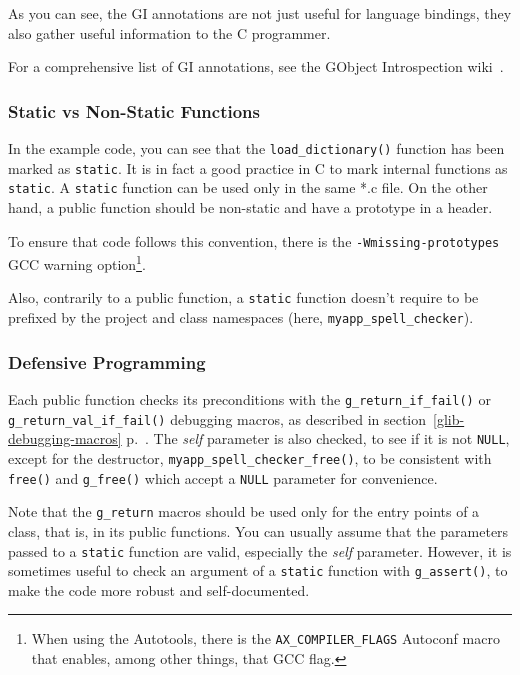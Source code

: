 As you can see, the GI annotations are not just useful for language bindings, they also gather useful information to the C programmer.

For a comprehensive list of GI annotations, see the GObject Introspection wiki~\cite{gobject-introspection}.

\subsubsection{Static vs Non-Static Functions}
In the example code, you can see that the \lstinline{load_dictionary()} function has been marked as \lstinline{static}. It is in fact a good practice in C to mark internal functions as \lstinline{static}. A \lstinline{static} function can be used only in the same *.c file. On the other hand, a public function should be non-static and have a prototype in a header.

To ensure that code follows this convention, there is the \texttt{-Wmissing-prototypes} GCC warning option\footnote{When using the Autotools, there is the \texttt{AX\_COMPILER\_FLAGS} Autoconf macro that enables, among other things, that GCC flag.}.

Also, contrarily to a public function, a \lstinline{static} function doesn't require to be prefixed by the project and class namespaces (here, \lstinline{myapp_spell_checker}).

\subsubsection{Defensive Programming}
Each public function checks its preconditions with the \lstinline{g_return_if_fail()} or \lstinline{g_return_val_if_fail()} debugging macros, as described in section~\ref{glib-debugging-macros} p.~\pageref{glib-debugging-macros}. The \emph{self} parameter is also checked, to see if it is not \lstinline{NULL}, except for the destructor, \lstinline{myapp_spell_checker_free()}, to be consistent with \lstinline{free()} and \lstinline{g_free()} which accept a \lstinline{NULL} parameter for convenience.

Note that the \lstinline{g_return} macros should be used only for the entry points of a class, that is, in its public functions. You can usually assume that the parameters passed to a \lstinline{static} function are valid, especially the \emph{self} parameter. However, it is sometimes useful to check an argument of a \lstinline{static} function with \lstinline{g_assert()}, to make the code more robust and self-documented.

